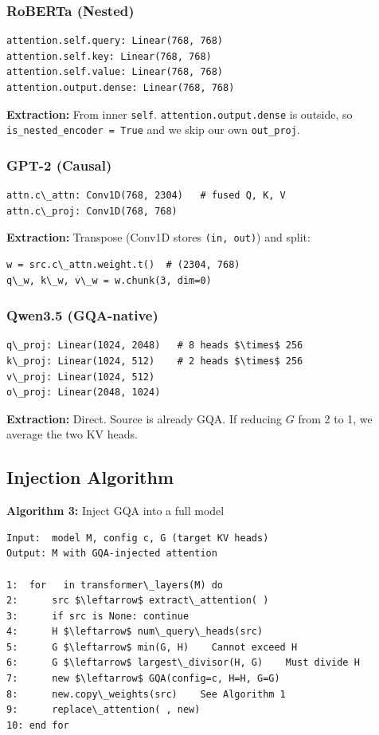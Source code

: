 \subsubsection{RoBERTa (Nested)}

\begin{lstlisting}
attention.self.query: Linear(768, 768)
attention.self.key: Linear(768, 768)
attention.self.value: Linear(768, 768)
attention.output.dense: Linear(768, 768)
\end{lstlisting}

\textbf{Extraction:} From inner \texttt{self}. \texttt{attention.output.dense} is outside, so 
\texttt{is\_nested\_encoder = True} and we skip our own \texttt{out\_proj}.

\subsubsection{GPT-2 (Causal)}

\begin{lstlisting}
attn.c\_attn: Conv1D(768, 2304)   # fused Q, K, V
attn.c\_proj: Conv1D(768, 768)
\end{lstlisting}

\textbf{Extraction:} Transpose (Conv1D stores \texttt{(in, out)}) and split:

\begin{lstlisting}
w = src.c\_attn.weight.t()  # (2304, 768)
q\_w, k\_w, v\_w = w.chunk(3, dim=0)
\end{lstlisting}

\subsubsection{Qwen3.5 (GQA-native)}

\begin{lstlisting}
q\_proj: Linear(1024, 2048)   # 8 heads $\times$ 256
k\_proj: Linear(1024, 512)    # 2 heads $\times$ 256
v\_proj: Linear(1024, 512)
o\_proj: Linear(2048, 1024)
\end{lstlisting}

\textbf{Extraction:} Direct. Source is already GQA. If reducing $G$ from 2 to 1, 
we average the two KV heads.

\subsection{Injection Algorithm}

\textbf{Algorithm 3:} Inject GQA into a full model
\begin{lstlisting}
Input:  model M, config c, G (target KV heads)
Output: M with GQA-injected attention

1:  for   in transformer\_layers(M) do
2:      src $\leftarrow$ extract\_attention( )
3:      if src is None: continue
4:      H $\leftarrow$ num\_query\_heads(src)
5:      G $\leftarrow$ min(G, H)    Cannot exceed H
6:      G $\leftarrow$ largest\_divisor(H, G)    Must divide H
7:      new $\leftarrow$ GQA(config=c, H=H, G=G)
8:      new.copy\_weights(src)    See Algorithm 1
9:      replace\_attention( , new)
10: end for
\end{lstlisting}

